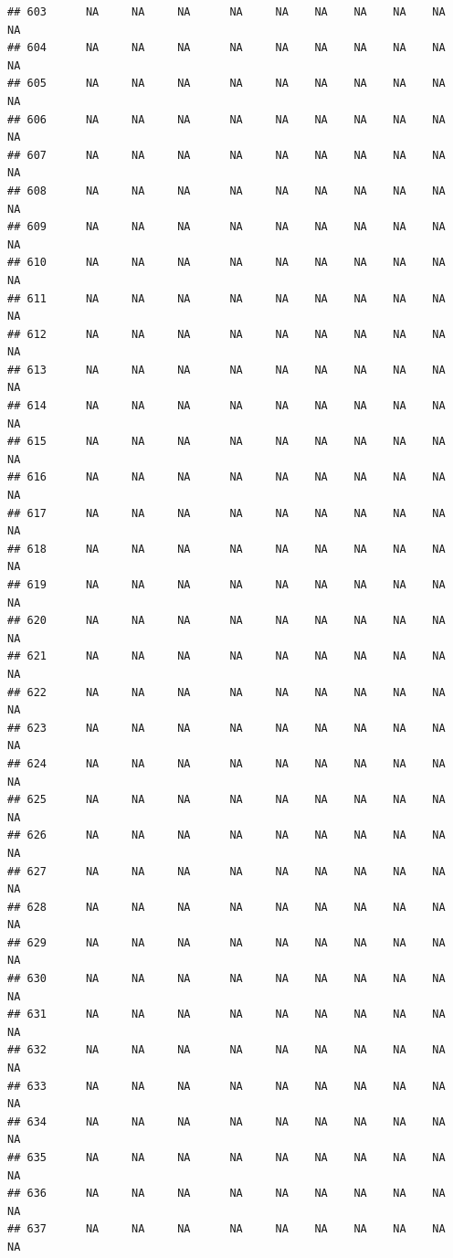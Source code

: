 \documentclass{article}\usepackage{graphicx, color}
\makeatletter
\newenvironment{kframe}{%
 \def\at@end@of@kframe{}%
 \ifinner\ifhmode%
  \def\at@end@of@kframe{\end{minipage}}%
  \begin{minipage}{\columnwidth}%
 \fi\fi%
 \def\FrameCommand##1{\hskip\@totalleftmargin \hskip-\fboxsep
 \colorbox{shadecolor}{##1}\hskip-\fboxsep
     \hskip-\linewidth \hskip-\@totalleftmargin \hskip\columnwidth}%
 \MakeFramed {\advance\hsize-\width
   \@totalleftmargin\z@ \linewidth\hsize
   \@setminipage}}%
 {\par\unskip\endMakeFramed%
 \at@end@of@kframe}
\newenvironment{knitrout}{}{} %
\makeatother
\begin{document}
\begin{knitrout}
\begin{kframe}
\begin{verbatim}
## 603      NA     NA     NA      NA     NA    NA    NA    NA    NA     NA
## 604      NA     NA     NA      NA     NA    NA    NA    NA    NA     NA
## 605      NA     NA     NA      NA     NA    NA    NA    NA    NA     NA
## 606      NA     NA     NA      NA     NA    NA    NA    NA    NA     NA
## 607      NA     NA     NA      NA     NA    NA    NA    NA    NA     NA
## 608      NA     NA     NA      NA     NA    NA    NA    NA    NA     NA
## 609      NA     NA     NA      NA     NA    NA    NA    NA    NA     NA
## 610      NA     NA     NA      NA     NA    NA    NA    NA    NA     NA
## 611      NA     NA     NA      NA     NA    NA    NA    NA    NA     NA
## 612      NA     NA     NA      NA     NA    NA    NA    NA    NA     NA
## 613      NA     NA     NA      NA     NA    NA    NA    NA    NA     NA
## 614      NA     NA     NA      NA     NA    NA    NA    NA    NA     NA
## 615      NA     NA     NA      NA     NA    NA    NA    NA    NA     NA
## 616      NA     NA     NA      NA     NA    NA    NA    NA    NA     NA
## 617      NA     NA     NA      NA     NA    NA    NA    NA    NA     NA
## 618      NA     NA     NA      NA     NA    NA    NA    NA    NA     NA
## 619      NA     NA     NA      NA     NA    NA    NA    NA    NA     NA
## 620      NA     NA     NA      NA     NA    NA    NA    NA    NA     NA
## 621      NA     NA     NA      NA     NA    NA    NA    NA    NA     NA
## 622      NA     NA     NA      NA     NA    NA    NA    NA    NA     NA
## 623      NA     NA     NA      NA     NA    NA    NA    NA    NA     NA
## 624      NA     NA     NA      NA     NA    NA    NA    NA    NA     NA
## 625      NA     NA     NA      NA     NA    NA    NA    NA    NA     NA
## 626      NA     NA     NA      NA     NA    NA    NA    NA    NA     NA
## 627      NA     NA     NA      NA     NA    NA    NA    NA    NA     NA
## 628      NA     NA     NA      NA     NA    NA    NA    NA    NA     NA
## 629      NA     NA     NA      NA     NA    NA    NA    NA    NA     NA
## 630      NA     NA     NA      NA     NA    NA    NA    NA    NA     NA
## 631      NA     NA     NA      NA     NA    NA    NA    NA    NA     NA
## 632      NA     NA     NA      NA     NA    NA    NA    NA    NA     NA
## 633      NA     NA     NA      NA     NA    NA    NA    NA    NA     NA
## 634      NA     NA     NA      NA     NA    NA    NA    NA    NA     NA
## 635      NA     NA     NA      NA     NA    NA    NA    NA    NA     NA
## 636      NA     NA     NA      NA     NA    NA    NA    NA    NA     NA
## 637      NA     NA     NA      NA     NA    NA    NA    NA    NA     NA

\end{verbatim}
\end{kframe}
\end{knitrout}
\end{document}
